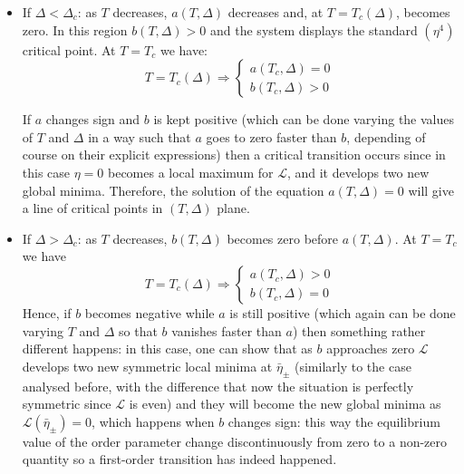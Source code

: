 \documentclass[../main/main.tex]{subfiles}
\begin{document}
\begin{itemize}

\item If \( \Delta < \Delta _c \): as \( T \) decreases, \( a(T,\Delta ) \) decreases and, at \( T = T_c (\Delta ) \), becomes zero. In this region \( b(T,\Delta ) >0 \) and the system displays the standard \( (\eta ^4) \) critical point. At \( T= T_c \) we have:
\begin{equation*}
  T = T_c (\Delta ) \Rightarrow \begin{cases}
    a (T_c,\Delta ) = 0 \\
    b (T_c,\Delta ) > 0
\end{cases}
\end{equation*}

If \( a \) changes sign and  \( b \) is kept positive (which can be done varying the values of \( T \) and \( \Delta  \) in a way such that \( a \) goes to zero faster than \( b \), depending of course on their explicit expressions) then a critical transition occurs since in this case \( \eta =0 \)  becomes a local maximum for \( \mathcal{L} \), and it develops two new global minima. Therefore, the solution of the equation  \( a(T,\Delta )=0 \)  will give a line of critical points in  \( (T,\Delta ) \) plane.

\item If \( \Delta > \Delta _c \): as \( T \) decreases, \( b(T,\Delta ) \) becomes zero before \( a(T,\Delta ) \). At \( T=T_c \) we have
\begin{equation*}
    T = T_c (\Delta ) \Rightarrow \begin{cases}
    a (T_c,\Delta ) > 0 \\
    b (T_c,\Delta ) = 0
\end{cases}
\end{equation*}
Hence, if \( b \) becomes negative while \( a \) is still positive (which again can be done varying \( T \) and \( \Delta  \) so that \( b \) vanishes faster than \( a \)) then something rather different happens: in this case, one can show that as  \( b \) approaches zero \( \mathcal{L} \)  develops two new symmetric local minima at \( \bar{\eta }_\pm  \) (similarly to the case analysed before, with the difference that now the situation is perfectly symmetric since \( \mathcal{L} \) is even) and they will become the new global minima as \( \mathcal{L} (\bar{\eta }_\pm ) = 0 \),
 which happens when \( b \) changes sign: this way the equilibrium value of the order parameter change discontinuously from zero to a non-zero quantity so a first-order transition has indeed happened.


\end{itemize}
\end{document}
